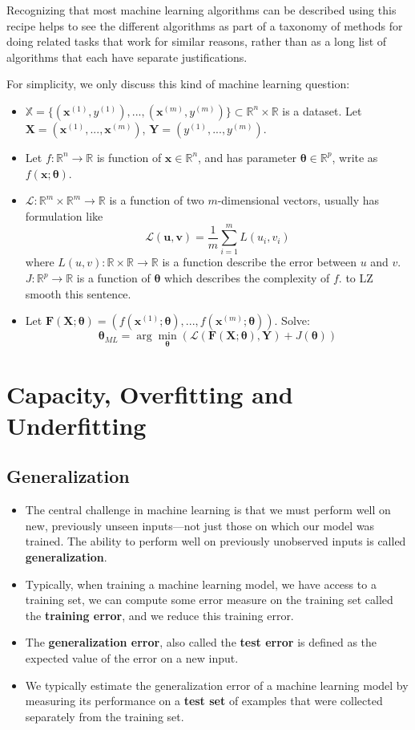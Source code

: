 Recognizing that most machine learning algorithms can be described using this recipe helps to see the different algorithms as part of a taxonomy of methods for doing related tasks that work for similar reasons, rather than as a long list of algorithms that each have separate justifications.

For simplicity, we only discuss this kind of machine learning question:
\begin{itemize}
\item $\mathbb X = \{(\bm x^{(1)},y^{(1)}),...,(\bm x^{(m)},y^{(m)})\} \subset \mathbb R^n \times \mathbb R$ is a dataset. Let $\bm X =(\bm x^{(1)},...,\bm x^{(m)})$, $\bm Y=(y^{(1)},...,y^{(m)})$.
\item Let $f:\mathbb R^n\rightarrow \mathbb R$ is function of $\bm x\in \mathbb R^n$, and has parameter $\bm \theta \in \mathbb R^p$, write as $f(\bm x;\bm \theta)$.
\item $\mathcal L:\mathbb R^{m}\times \mathbb R^{m}\rightarrow \mathbb R$ is a function of two $m$-dimensional vectors, usually has formulation like 
$$
\mathcal L(\bm u,\bm v)=\dfrac 1m\sum_{i=1}^m L(u_i,v_i)
$$
where $L(u,v):\mathbb R \times \mathbb R \rightarrow \mathbb R$ is a function describe the error between $u$ and $v$. $J:\mathbb R^p\rightarrow \mathbb R$ is a function of $\bm \theta$ which describes the complexity of $f$.{\color{red} to LZ smooth this sentence.}
\item Let $\bm F(\bm X;\bm \theta)=(f(\bm x^{(1)};\bm \theta),...,f(\bm x^{(m)};\bm \theta))$. Solve:
$$
\bm \theta_{ML}=\arg \min_{\bm \theta}( \mathcal L(\bm F(\bm X;\bm \theta),\bm Y) + J(\bm \theta))
$$
\end{itemize}

\section{Capacity, Overfitting and Underfitting}
\subsection{Generalization}
\begin{itemize}
    \item The central challenge in machine learning is that we must perform well on new, previously unseen inputs---not just those on which our model was trained. The ability to perform well on previously unobserved inputs is called \textbf{generalization}.
    \item Typically, when training a machine learning model, we have access to a training	set, we can compute some error measure on the training set called the \textbf{training	error}, and we reduce this training error.
    \item The \textbf{generalization error}, also called the \textbf{test error} is defined as the expected value of the error on a new input.
    \item We typically estimate the generalization error of a machine learning model by measuring its performance on a \textbf{test set} of examples that were collected separately from the training set.
    
\end{itemize}


